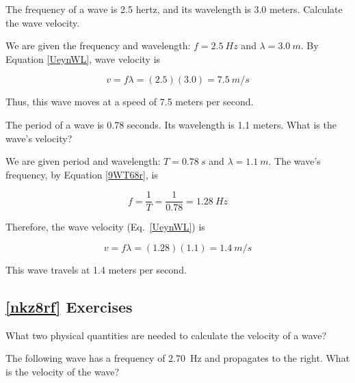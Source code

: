 \documentclass[main.tex]{subfiles}
\begin{document}

\begin{example}
The frequency of a wave is 2.5 hertz, and its wavelength is 3.0 meters. Calculate the wave velocity.
\end{example}

\Solution We are given the frequency and wavelength: $f = \SI{2.5}{Hz}$ and $\lambda = \SI{3.0}{m}$. By Equation \eqref{UeynWL}, wave velocity is

\begin{equation*}
    v = f \lambda = (2.5)(3.0) = \SI{7.5}{m/s}
\end{equation*}

Thus, this wave moves at a speed of 7.5 meters per second.

\solutionEnd

\begin{example}
    The period of a wave is 0.78 seconds. Its wavelength is 1.1 meters. What is the wave's velocity?
\end{example}

\Solution We are given period and wavelength: $T = \SI{0.78}{s}$ and $\lambda = \SI{1.1}{m}$. The wave's frequency, by Equation \eqref{9WT68r}, is

\begin{equation*}
    f = \frac{1}{T} = \frac{1}{0.78} = \SI{1.28}{Hz}
\end{equation*}


Therefore, the wave velocity (Eq.~\ref{UeynWL}) is

\begin{equation*}
    v = f \lambda = (1.28)(1.1) = \SI{1.4}{m/s}
\end{equation*}

This wave travels at 1.4 meters per second.

\solutionEnd

\subsection*{\ref{nkz8rf} Exercises}

\begin{exercise}
    What two physical quantities are needed to calculate the velocity of a wave?
\end{exercise}

\begin{exercise} \label{SKv3ek}
    The following wave has a frequency of \SI{2.70}{Hz} and propagates to the right. What is the velocity of the wave?
\end{exercise}
\end{document}

